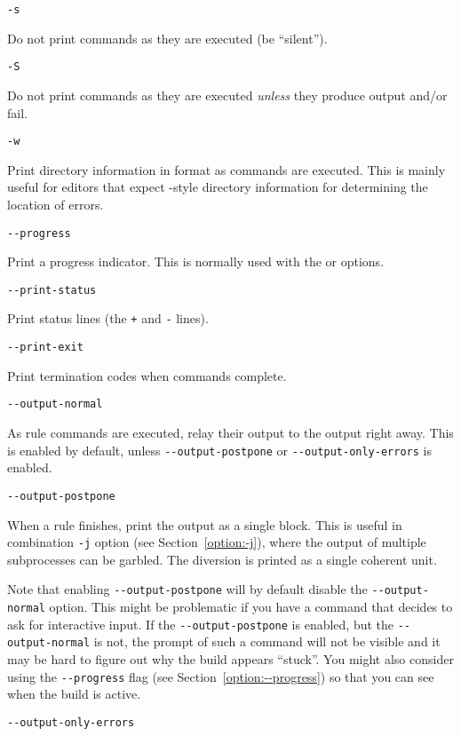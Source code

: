  \verb+-s+

Do not print commands as they are executed (be ``silent'').

 \verb+-S+

Do not print commands as they are executed \emph{unless} they produce output and/or
fail.

 \verb+-w+

Print directory information in  format as commands are executed.
This is mainly useful for editors that expect -style
directory information for determining the location of errors.

 \verb+--progress+

Print a progress indicator.
This is normally used with the  or  options.

 \verb+--print-status+

Print status lines (the \verb/+/ and \verb/-/ lines).

 \verb+--print-exit+

Print termination codes when commands complete.

 \verb+--output-normal+

As rule commands are executed, relay their output to the \OMake{} output right away. This is enabled
by default, unless \verb+--output-postpone+ or \verb+--output-only-errors+ is enabled.

 \verb+--output-postpone+

When a rule finishes, print the output as a single block.  This is useful in combination \verb+-j+
option (see Section~\ref{option:-j}), where the output of multiple subprocesses can be garbled.  The
diversion is printed as a single coherent unit.

Note that enabling \verb+--output-postpone+ will by default disable the \verb+--output-normal+
option. This might be problematic if you have a command that decides to ask for interactive input.
If the \verb+--output-postpone+ is enabled, but the \verb+--output-normal+ is not, the prompt of
such a command will not be visible and it may be hard to figure out why the build appears ``stuck''.
You might also consider using the \verb+--progress+ flag (see Section~\ref{option:--progress}) so
that you can see when the build is active. 

 \verb+--output-only-errors+ 

